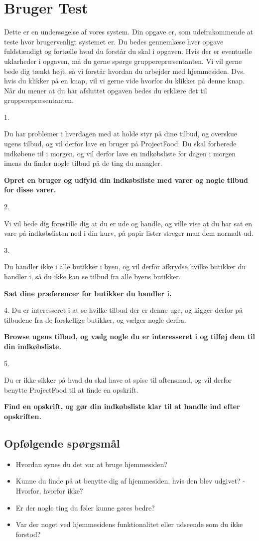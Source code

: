 \chapter{Bruger Test}

Dette er en undersøgelse af vores system. Din opgave er, som udefrakommende at teste hvor brugervenligt systemet er. Du bedes gennemlæse hver opgave fuldstændigt og fortælle hvad du forstår du skal i opgaven. Hvis der er eventuelle uklarheder i opgaven, må du gerne spørge grupperepræsentanten. Vi vil gerne bede dig tænkt højt, så vi forstår hvordan du arbejder med hjemmesiden. Dvs. hvis du klikker på en knap, vil vi gerne vide hvorfor du klikker på denne knap. Når du mener at du har afsluttet opgaven bedes du erklære det til grupperepræsentanten.

1.

Du har problemer i hverdagen med at holde styr på dine tilbud, og overskue ugens tilbud, og vil derfor lave en bruger på ProjectFood. Du skal forberede indkøbene til i morgen, og vil derfor lave en indkøbsliste for dagen i morgen imens du finder nogle tilbud på de ting du mangler.

\textbf{Opret en bruger og udfyld din indkøbsliste med varer og nogle tilbud for disse varer.}

2. 

Vi vil bede dig forestille dig at du er ude og handle, og ville vise at du har sat en vare på indkøbslisten ned i din kurv, på papir lister streger man dem normalt ud.

3.

Du handler ikke i alle butikker i byen, og vil derfor afkrydse hvilke butikker du handler i, så du ikke kan se tilbud fra alle byens butikker.

\textbf{Sæt dine præferencer for butikker du handler i.}

4.
Du er interesseret i at se hvilke tilbud der er denne uge, og kigger derfor på tilbudene fra de forskellige butikker, og vælger nogle derfra.

\textbf{Browse ugens tilbud, og vælg nogle du er interesseret i og tilføj dem til din indkøbsliste.}

5.

Du er ikke sikker på hvad du skal have at spise til aftensmad, og vil derfor benytte ProjectFood til at finde en opskrift. 

\textbf{Find en opskrift, og gør din indkøbsliste klar til at handle ind efter opskriften.}


\section{Opfølgende spørgsmål}

\begin{itemize}
	\item Hvordan synes du det var at bruge hjemmesiden?
	\item Kunne du finde på at benytte dig af hjemmesiden, hvis den blev udgivet? - Hvorfor, hvorfor ikke?
	\item Er der nogle ting du føler kunne gøres bedre?
	\item Var der noget ved hjemmesidens funktionalitet eller udseende som du ikke forstod?
\end{itemize}
